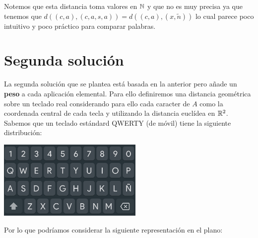 \documentclass[12pt]{article}
\begin{document}
Notemos que esta distancia toma valores en $\mathbb{N}$ y que no es muy precisa ya que tenemos que $d((c,a), (c,a,s,a)) = d((c,a), (x,\tilde{n}))$ lo cual parece poco intuitivo y poco práctico para comparar palabras.

\section{Segunda solución}

La segunda solución que se plantea está basada en la anterior pero añade un \textbf{peso} a cada aplicación elemental. Para ello definiremos una distancia geométrica sobre un teclado real considerando para ello cada caracter de $A$ como la coordenada central de cada tecla y utilizando la distancia euclídea en $\mathbb{R}^2$.
Sabemos que un teclado estándard QWERTY (de móvil) tiene la siguiente distribución:

\begin{center}
    \includegraphics[width=7cm]{teclado.png}
\end{center}

Por lo que podríamos considerar la siguiente representación en el plano:
\vspace*{0.5cm}

\end{document}
